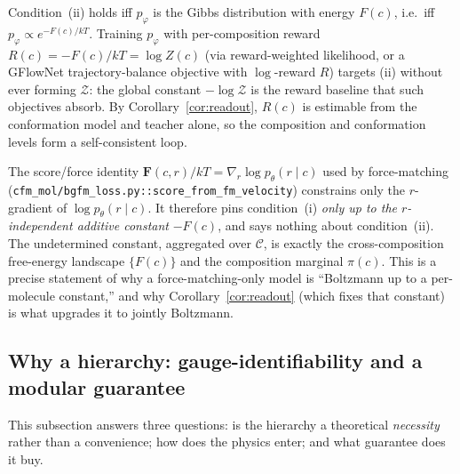 \begin{corollary}
\label{cor:reward}
Condition~(ii) holds iff $p_\varphi$ is the Gibbs distribution with energy $F(c)$, i.e.\
iff $p_\varphi \propto e^{-F(c)/kT}$. Training $p_\varphi$ with per-composition reward
$R(c) = -F(c)/kT = \log Z(c)$ (via reward-weighted likelihood, or a GFlowNet
trajectory-balance objective with $\log$-reward $R$) targets (ii) without ever forming
$\mathcal{Z}$: the global constant $-\log\mathcal{Z}$ is the reward baseline that such
objectives absorb. By Corollary~\ref{cor:readout}, $R(c)$ is estimable from the
conformation model and teacher alone, so the composition and conformation levels form a
self-consistent loop.
\end{corollary}

\begin{remark}
The score/force identity $\mathbf{F}(c,r)/kT = \nabla_r \log p_\theta(r\mid c)$ used by
force-matching (\texttt{cfm\_mol/bgfm\_loss.py::score\_from\_fm\_velocity}) constrains only
the $r$-gradient of $\log p_\theta(r\mid c)$. It therefore pins condition~(i) \emph{only up
to the $r$-independent additive constant} $-F(c)$, and says nothing about condition~(ii).
The undetermined constant, aggregated over $\mathcal{C}$, is exactly the cross-composition
free-energy landscape $\{F(c)\}$ and the composition marginal $\pi(c)$. This is a precise
statement of why a force-matching-only model is ``Boltzmann up to a per-molecule
constant,'' and why Corollary~\ref{cor:readout} (which fixes that constant) is what
upgrades it to jointly Boltzmann.
\end{remark}

\subsection{Why a hierarchy: gauge-identifiability and a modular guarantee}
\label{app:why-hierarchy}

\newtheorem{lemma}{Lemma}
\newtheorem{proposition}{Proposition}

This subsection answers three questions: is the hierarchy a theoretical
\emph{necessity} rather than a convenience; how does the physics enter; and what
guarantee does it buy.

